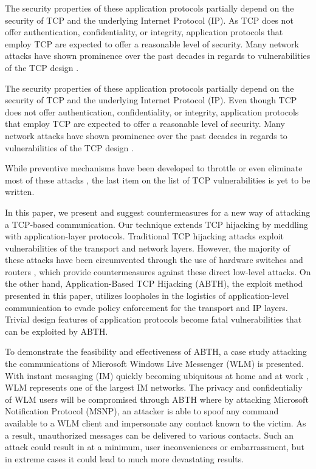 \documentclass{sig-alternate}
\begin{document}
The security properties of these application protocols partially depend on the security of TCP and the underlying Internet Protocol (IP).
As TCP does not offer authentication, confidentiality, or integrity, application protocols that employ TCP are expected to offer a reasonable level of security.
Many network attacks have shown prominence over the past decades in regards to vulnerabilities of the TCP design \cite{harris:tcpattacks}.

The security properties of these application protocols partially depend on the security of TCP and the underlying Internet Protocol (IP).
Even though TCP does not offer authentication, confidentiality, or integrity, application protocols that employ TCP are expected to offer a reasonable level of security.
Many network attacks have shown prominence over the past decades in regards to vulnerabilities of the TCP design \cite{harris:tcpattacks}.

While preventive mechanisms have been developed to throttle or even eliminate most of these attacks \cite{dubrawsky:layer2}, the last item on the list of TCP vulnerabilities is yet to be written.

In this paper, we present and suggest countermeasures for a new way of attacking a TCP-based communication.
Our technique extends TCP hijacking \cite{stamp:infosec} by meddling with application-layer protocols.
Traditional TCP hijacking attacks exploit vulnerabilities of the transport and network layers.
However, the majority of these attacks have been circumvented through the use of hardware switches and routers \cite{dubrawsky:layer2}, which provide countermeasures against these direct low-level attacks.
On the other hand, Application-Based TCP Hijacking (ABTH), the exploit method presented in this paper, utilizes loopholes in the logistics of application-level communication to evade policy enforcement for the transport and IP layers.
Trivial design features of application protocols become fatal vulnerabilities that can be exploited by ABTH.

To demonstrate the feasibility and effectiveness of ABTH, a case study attacking the communications of Microsoft Windows Live Messenger (WLM) is presented.
With instant messaging (IM) quickly becoming ubiquitous at home and at work \cite{aol:survey}, WLM represents one of the largest IM networks.
The privacy and confidentialiy of WLM users will be compromised through ABTH where by attacking Microsoft Notification Protocol (MSNP), an attacker is able to spoof any command available to a WLM client and impersonate any contact known to the victim.
As a result, unauthorized messages can be delivered to various contacts.
Such an attack could result in at a minimum, user inconveniences or embarrassment, but in extreme cases it could lead to much more devastating results.
\end{document}

